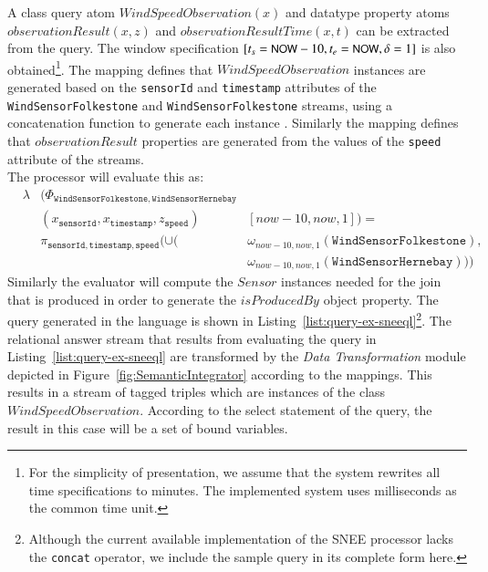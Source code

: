 A class query atom $WindSpeedObservation(x)$ and datatype property atoms $observationResult(x,z)$ and $observationResultTime(x,t)$ can be extracted from the \sparqlstr query. 
The window specification $[t_s=\textsf{\small{NOW}}-10,t_e=\textsf{\small{NOW}},\delta=1]$ is also obtained\footnote{For the simplicity of presentation, we assume that the system rewrites all time specifications to minutes.
The implemented system uses milliseconds as the common time unit.}.
The \stwoo mapping defines that $WindSpeedObservation$ instances are generated based on the \texttt{sensorId} and \texttt{timestamp} attributes of the \texttt{WindSensorFolkestone} and \texttt{WindSensorFolkestone} streams, using a concatenation function to generate each instance \uri.
Similarly the \stwoo mapping defines that $observationResult$ properties are generated from the values of the \texttt{speed} attribute of the streams. \\
The processor will evaluate this as:
\begin{align*}
&\lambda&(\Phi_{ \mathtt{WindSensorFolkestone,WindSensorHernebay}}& \\
&&(x_{\mathtt{sensorId}},x_{\mathtt{timestamp}},z_{\mathtt{speed}})&[now-10,now,1]) = \\ 
&&\pi_{\mathtt{sensorId,timestamp,speed}}( \cup(& \omega_{now-10,now,1}( \mathtt{WindSensorFolkestone}), \\
&&&\omega_{now-10,now,1}(\mathtt{WindSensorHernebay})))
\end{align*}
Similarly the evaluator will compute the $Sensor$ instances needed for the join that is produced in order to generate the $isProducedBy$ object property.
The query generated in the \sneeql language is shown in Listing~\ref{list:query-ex-sneeql}\footnote {Although the current available implementation of the SNEE processor lacks the \texttt{concat} operator, we include the sample query in its complete form here.}. The relational answer stream that results from evaluating the query in Listing~\ref{list:query-ex-sneeql} are transformed by the \textit{Data Transformation} module depicted in Figure~\ref{fig:SemanticIntegrator} according to the \stwoo mappings.
This results in a stream of tagged triples which are instances of the class $WindSpeedObservation$. According to the select statement of the \sparqlstr query, the result in this case will be a set of bound variables.

